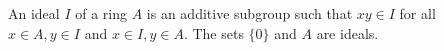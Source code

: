 An ideal $I$ of a ring $A$ is an additive subgroup such that $xy \in I$ for all $x \in A, y \in I$ and $x \in I, y \in A$. The sets $\{0\}$ and $A$ are ideals.
